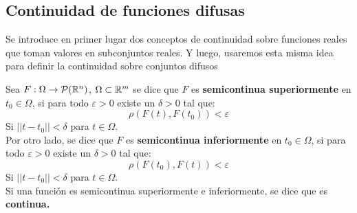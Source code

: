   \iffalse
  \begin{definicion}[Ristra de funciones difusas]
    Definimos una ristra de funciones difusas como el subconjunto difuso del espacio de funciones. \\
    Para cada ristra de funciones difusas, podemos darle una función definida en un conjunto difuso. Para cada $F \in \mathcal{F}(E(I; \IR^n))$ donde $E(I, \IR^n)$ es una espacio de funciones de $I \subset \IR$ a $\IR^n$. Donde:
    \[
      [F(t)]_\alpha = [F]_\alpha(t) = \{f(t) : f \in [F]_\alpha\}
      \]
  \end{definicion}

  \begin{ejemplo}
    Consideramos $f_1, f_2$ y $f_3$ funciones continuas en el intervalo $A=[a, b]$. Y definimos el conjunto difuso $F \in \mathcal{F}(C([a, b]; \IR))$ tal que:
    \[
    \mu_F(f) = \left\{
    \begin{array}{ccc}
      \alpha & si & f = f_1 + \alpha(f_2 - f_1) \\
      \alpha & si & f = f_3 + \alpha(f_2 - f_3) \\
      0 & otro~caso & 
    \end{array}
    \right.
    \]
    
    Entonces, decimos que $F$ es una ristra de funciones difusas.
  \end{ejemplo}

  \fi

  \subsection{Continuidad de funciones difusas}
  Se introduce en primer lugar dos conceptos de continuidad sobre funciones reales que toman valores en subconjuntos reales. Y luego, usaremos esta misma idea para definir la continuidad sobre conjuntos difusos

  \begin{definicion}
    \label{def:funcioncontinua}
    Sea $F : \Omega \rightarrow \mathcal{P}(\mathbb R^n)$, $\Omega \subset \mathbb R^m$ se dice que $F$ es \textbf{semicontinua superiormente} en $t_0 \in \Omega$, si para todo $\varepsilon>0$ existe un $\delta>0$ tal que:
    \[
    \rho(F(t), F(t_0))<\varepsilon
    \]
    Si $||t-t_0||<\delta$ para $t \in \Omega$. \\
    Por otro lado, se dice que $F$  es \textbf{semicontinua inferiormente} en $t_0 \in \Omega$, si para todo $\varepsilon>0$ existe un $\delta>0$ tal que:
    \[
    \rho(F(t_0), F(t))<\varepsilon
    \]
    Si $||t-t_0||<\delta$ para $t \in \Omega$. \\
    Si una función es semicontinua superiormente e inferiormente, se dice que es \textbf{continua.}
  \end{definicion}


